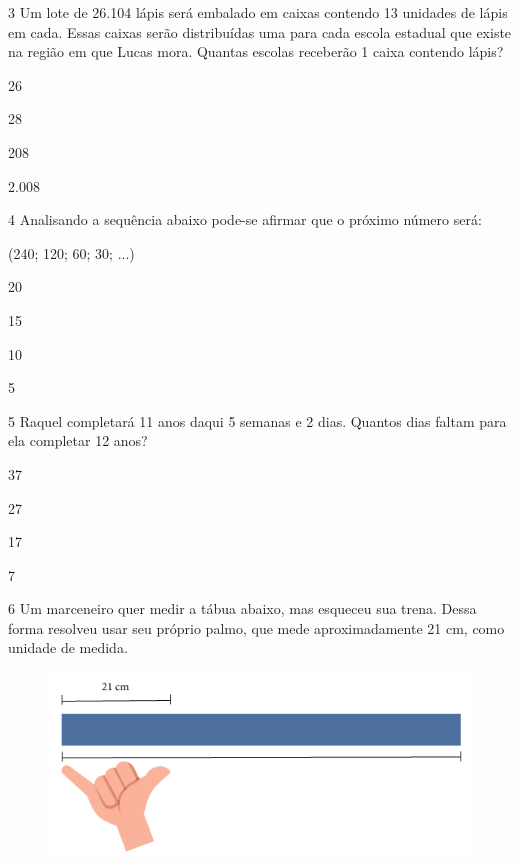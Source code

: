 \num{3} Um lote de 26.104 lápis será embalado em caixas contendo 13
unidades de lápis em cada. Essas caixas serão distribuídas uma para cada
escola estadual que existe na região em que Lucas mora. Quantas escolas
receberão 1 caixa contendo lápis?

\begin{minipage}{.5\textwidth}
\begin{escolha}
\item
  26
\item
  28
\item
  208
\item
  2.008
\end{escolha}
\end{minipage}




\num{4} Analisando a sequência abaixo pode-se afirmar que o próximo número
será:

(240; 120; 60; 30; ...)

\begin{minipage}{.5\textwidth}
\begin{escolha}
\item
  20
\item
  15
\item
  10
\item
  5
\end{escolha}
\end{minipage}




\num{5} Raquel completará 11 anos daqui 5 semanas e 2 dias. Quantos dias
faltam para ela completar 12 anos?

\begin{minipage}{.5\textwidth}
\begin{escolha}
\item
  37
\item
  27
\item
  17
\item
  7
\end{escolha}
\end{minipage}


\pagebreak
\num{6} Um marceneiro quer medir a tábua abaixo, mas esqueceu sua trena.
Dessa forma resolveu usar seu próprio palmo, que mede aproximadamente 
21 cm, como unidade de medida.

\begin{figure}[htpb!]
\includegraphics[width=\textwidth]{../ilustracoes/MAT5/SAEB_5ANO_MAT_figura117.png}
\end{figure}

